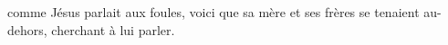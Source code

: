 \encetemps comme Jésus parlait aux foules,
	voici que sa mère et ses frères se tenaient au-dehors, cherchant à lui parler.

